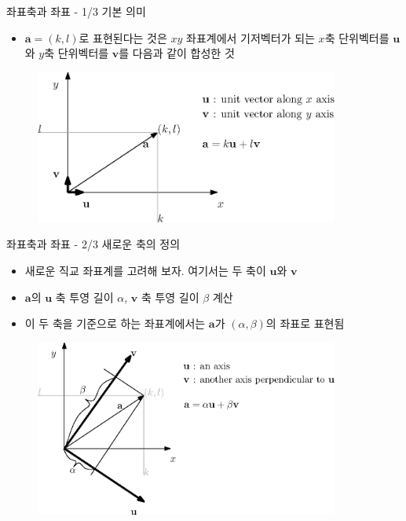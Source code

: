 \documentclass{beamer}
\begin{document}
\begin{frame}{좌표축과 좌표 - 1/3 기본 의미}

\begin{itemize}
\item $\mathbf a  = (k, l)$로 표현된다는 것은 $xy$ 좌표계에서 기저벡터가 되는
$x$축 단위벡터를 $\mathbf u$와 $y$축 단위벡터를 $\mathbf v$를 다음과 같이 합성한 것
\end{itemize}

\begin{figure}
\includegraphics[width=10cm]{Math_vector/vectorComponents.eps}
\end{figure}

\end{frame}


\begin{frame}{좌표축과 좌표 - 2/3 새로운 축의 정의}

\begin{itemize}
\item 새로운 직교 좌표계를 고려해 보자. 여기서는 두 축이 $\mathbf u$와 $\mathbf v$
\item $\mathbf a$의 $\mathbf u$ 축 투영 길이 $\alpha$, $\mathbf v$ 축 투영 길이 $\beta$ 계산
\item 이 두 축을 기준으로 하는 좌표계에서는 $\mathbf a$가 $(\alpha, \beta)$의 좌표로 표현됨
\end{itemize}


\begin{figure}
\includegraphics[width=10cm]{Math_vector/vectorComponentsArb.eps}
\end{figure}

\end{frame}
\end{document}
